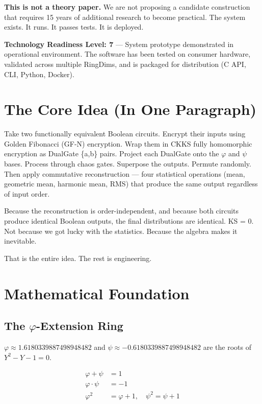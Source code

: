 \documentclass[11pt,a4paper]{article}
\begin{document}
\textbf{This is not a theory paper.} We are not proposing a candidate construction that requires 15 years of additional research to become practical. The system exists. It runs. It passes tests. It is deployed.

\textbf{Technology Readiness Level: 7} --- System prototype demonstrated in operational environment. The software has been tested on consumer hardware, validated across multiple RingDims, and is packaged for distribution (C API, CLI, Python, Docker).

\section{The Core Idea (In One Paragraph)}

Take two functionally equivalent Boolean circuits. Encrypt their inputs using Golden Fibonacci (GF-N) encryption. Wrap them in CKKS fully homomorphic encryption as DualGate \{a,b\} pairs. Project each DualGate onto the $\varphi$ and $\psi$ bases. Process through chaos gates. Superpose the outputs. Permute randomly. Then apply commutative reconstruction --- four statistical operations (mean, geometric mean, harmonic mean, RMS) that produce the same output regardless of input order.

Because the reconstruction is order-independent, and because both circuits produce identical Boolean outputs, the final distributions are identical. KS = 0. Not because we got lucky with the statistics. Because the algebra makes it inevitable.

That is the entire idea. The rest is engineering.

\section{Mathematical Foundation}

\subsection{The $\varphi$-Extension Ring}

$\varphi \approx 1.6180339887498948482$ and $\psi \approx -0.6180339887498948482$ are the roots of $Y^2 - Y - 1 = 0$.

\begin{align}
\varphi + \psi &= 1 \\
\varphi \cdot \psi &= -1 \\
\varphi^2 &= \varphi + 1,\quad \psi^2 = \psi + 1
\end{align}
\end{document}
